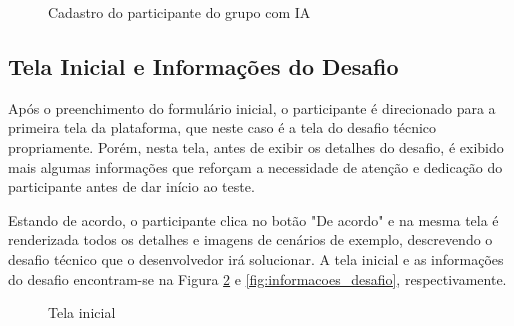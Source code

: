 \documentclass[english,brazilian]{UNISINOSartigo} %
\begin{document}
\begin{figure}[ht]
    \caption{Cadastro do participante do grupo com IA}
    \label{fig:cadastro_com_ia}
    \centering
    \footnotesize
    \begin{minipage}{.9\textwidth}
        \centering
    \end{minipage}
\end{figure}
\FloatBarrier

\subsection{Tela Inicial e Informações do Desafio}

Após o preenchimento do formulário inicial, o participante é direcionado para a primeira tela da plataforma, que neste caso é a tela do desafio técnico propriamente. Porém, nesta tela, antes de exibir os detalhes do desafio, é exibido mais algumas informações que reforçam a necessidade de atenção e dedicação do participante antes de dar início ao teste. 

Estando de acordo, o participante clica no botão "De acordo" e na mesma tela é renderizada todos os detalhes e imagens de cenários de exemplo, descrevendo o desafio técnico que o desenvolvedor irá solucionar. A tela inicial e as informações do desafio encontram-se na Figura \ref{fig:tela_inicial} e \ref{fig:informacoes_desafio}, respectivamente.

\begin{figure}[ht]
    \caption{Tela inicial}
    \label{fig:tela_inicial}
    \centering
    \footnotesize
    \begin{minipage}{.9\textwidth}
        \centering
    \end{minipage}
\end{figure}
\FloatBarrier
\end{document}
